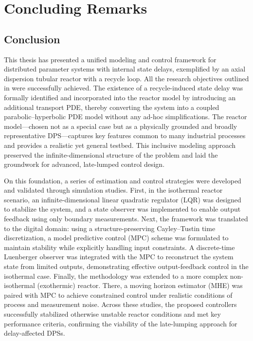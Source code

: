 \chapter{Concluding Remarks}\label{ch:4}
	\section{Conclusion}
		This thesis has presented a unified modeling and control framework for distributed parameter systems with internal state delays, exemplified by an axial dispersion tubular reactor with a recycle loop. All the research objectives outlined in  were successfully achieved. The existence of a recycle-induced state delay was formally identified and incorporated into the reactor model by introducing an additional transport PDE, thereby converting the system into a coupled parabolic–hyperbolic PDE model without any ad-hoc simplifications. The reactor model—chosen not as a special case but as a physically grounded and broadly representative DPS—captures key features common to many industrial processes and provides a realistic yet general testbed. This inclusive modeling approach preserved the infinite-dimensional structure of the problem and laid the groundwork for advanced, late-lumped control design.

		On this foundation, a series of estimation and control strategies were developed and validated through simulation studies. First, in the isothermal reactor scenario, an infinite-dimensional linear quadratic regulator (LQR) was designed to stabilize the system, and a state observer was implemented to enable output feedback using only boundary measurements. Next, the framework was translated to the digital domain: using a structure-preserving Cayley–Tustin time discretization, a model predictive control (MPC) scheme was formulated to maintain stability while explicitly handling input constraints. A discrete-time Luenberger observer was integrated with the MPC to reconstruct the system state from limited outputs, demonstrating effective output-feedback control in the isothermal case. Finally, the methodology was extended to a more complex non-isothermal (exothermic) reactor. There, a moving horizon estimator (MHE) was paired with MPC to achieve constrained control under realistic conditions of process and measurement noise. Across these studies, the proposed controllers successfully stabilized otherwise unstable reactor conditions and met key performance criteria, confirming the viability of the late-lumping approach for delay-affected DPSs.

